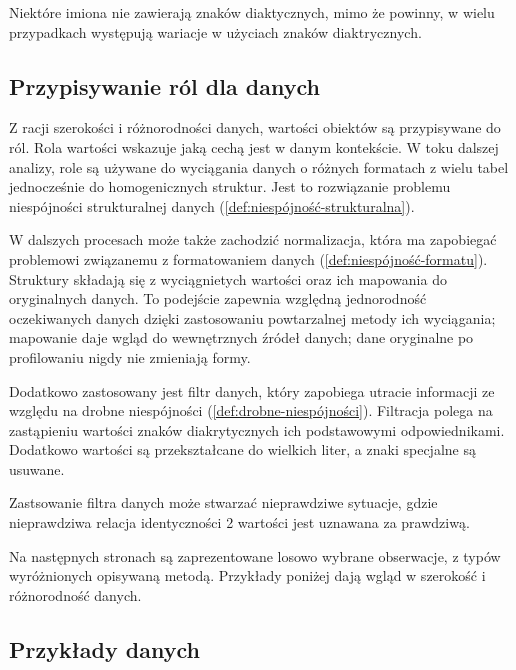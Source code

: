 \begin{przykład}
Niektóre imiona nie zawierają znaków diaktycznych, mimo że powinny,
w wielu przypadkach występują wariacje w użyciach znaków diaktrycznych.
\end{przykład}

\subsection{Przypisywanie ról dla danych}

Z racji szerokości i różnorodności danych,
wartości obiektów są przypisywane do ról. Rola wartości wskazuje 
jaką cechą jest w danym kontekście. W toku dalszej analizy, 
role są używane do wyciągania danych o różnych formatach 
z wielu tabel jednocześnie do homogenicznych struktur.
Jest to rozwiązanie problemu niespójności strukturalnej danych
(\cref{def:niespójność-strukturalna}).

W dalszych procesach może także zachodzić normalizacja,
która ma zapobiegać problemowi związanemu z formatowaniem danych 
(\cref{def:niespójność-formatu}).
Struktury składają się z wyciągnietych
wartości oraz ich mapowania do oryginalnych danych.
To podejście zapewnia względną jednorodność oczekiwanych danych
dzięki zastosowaniu powtarzalnej metody ich wyciągania;
mapowanie daje wgląd do wewnętrznych źródeł danych; dane oryginalne
po profilowaniu nigdy nie zmieniają formy.

Dodatkowo zastosowany jest filtr danych, który zapobiega utracie
informacji ze względu na drobne niespójności (\cref{def:drobne-niespójności}).
Filtracja polega na zastąpieniu wartości znaków diakrytycznych ich
podstawowymi odpowiednikami. Dodatkowo wartości są przekształcane
do wielkich liter, a znaki specjalne są usuwane.

\begin{uwaga}
Zastsowanie filtra danych może stwarzać nieprawdziwe sytuacje, gdzie
nieprawdziwa relacja identyczności 2 wartości jest uznawana za prawdziwą.
\end{uwaga}

Na następnych stronach są zaprezentowane losowo wybrane obserwacje, 
z typów wyróżnionych opisywaną metodą. Przykłady poniżej dają wgląd
w szerokość i różnorodność danych.

\newpage
\subsection{Przykłady danych}

\footnotesize

\normalsize
\newpage